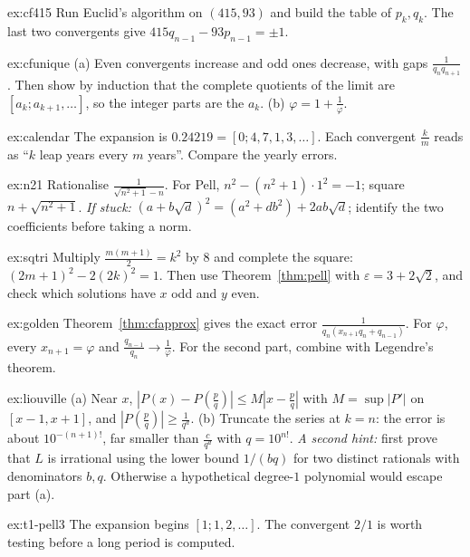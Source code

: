 \begin{hint}{ex:cf415}
Run Euclid's algorithm on $(415,93)$ and build the table of $p_k,q_k$. The last two convergents give $415q_{n-1}-93p_{n-1}=\pm1$.
\end{hint}
\begin{hint}{ex:cfunique}
(a) Even convergents increase and odd ones decrease, with gaps $\frac1{q_nq_{n+1}}$. Then show by induction that the complete quotients of the limit are $[a_k;a_{k+1},\dots]$, so the integer parts are the $a_k$. (b) $\varphi=1+\frac1\varphi$.
\end{hint}
\begin{hint}{ex:calendar}
The expansion is $0.24219=[0;4,7,1,3,\dots]$. Each convergent $\frac km$ reads as ``$k$ leap years every $m$ years''. Compare the yearly errors.
\end{hint}
\begin{hint}{ex:n21}
Rationalise $\frac1{\sqrt{n^2+1}-n}$. For Pell, $n^2-(n^2+1)\cdot1^2=-1$; square $n+\sqrt{n^2+1}$. \emph{If stuck:} $(a+b\sqrt d)^2=(a^2+db^2)+2ab\sqrt d$; identify the two coefficients before taking a norm.
\end{hint}
\begin{hint}{ex:sqtri}
Multiply $\frac{m(m+1)}2=k^2$ by $8$ and complete the square: $(2m+1)^2-2(2k)^2=1$. Then use Theorem~\ref{thm:pell} with $\varepsilon=3+2\sqrt2$, and check which solutions have $x$ odd and $y$ even.
\end{hint}
\begin{hint}{ex:golden}
Theorem~\ref{thm:cfapprox} gives the exact error $\frac1{q_n(x_{n+1}q_n+q_{n-1})}$. For $\varphi$, every $x_{n+1}=\varphi$ and $\frac{q_{n-1}}{q_n}\to\frac1\varphi$. For the second part, combine with Legendre's theorem.
\end{hint}
\begin{hint}{ex:liouville}
(a) Near $x$, $|P(x)-P(\frac pq)|\le M|x-\frac pq|$ with $M=\sup|P'|$ on $[x-1,x+1]$, and $|P(\frac pq)|\ge\frac1{q^d}$. (b) Truncate the series at $k=n$: the error is about $10^{-(n+1)!}$, far smaller than $\frac c{q^d}$ with $q=10^{n!}$. \emph{A second hint:} first prove that $L$ is irrational using the lower bound $1/(bq)$ for two distinct rationals with denominators $b,q$. Otherwise a hypothetical degree-$1$ polynomial would escape part (a).
\end{hint}

\begin{hint}{ex:t1-pell3}
The expansion begins $[1;1,2,\ldots]$. The convergent $2/1$ is worth testing before a long period is computed.
\end{hint}

